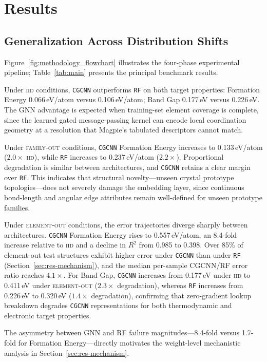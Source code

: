 \documentclass[final,5p,twocolumn,10pt]{elsarticle}
\newcommand{\mae}{\text{MAE}}
\newcommand{\iid}{\textsc{iid}}
\newcommand{\famout}{\textsc{family-out}}
\newcommand{\elout}{\textsc{element-out}}
\newcommand{\cgcnn}{\texttt{CGCNN}}
\newcommand{\rf}{\texttt{RF}}
\begin{document}
\section{Results}
\label{sec:results}

\subsection{Generalization Across Distribution Shifts}
\label{sec:res-shift}

Figure~\ref{fig:methodology_flowchart} illustrates the four-phase experimental
pipeline; Table~\ref{tab:main} presents the principal benchmark results.

Under \iid{} conditions, \cgcnn{} outperforms \rf{} on both target properties:
Formation Energy \mae{} 0.066\,eV/atom versus 0.106\,eV/atom; Band Gap
\mae{} 0.177\,eV versus 0.226\,eV. The GNN advantage is expected when
training-set element coverage is complete, since the learned gated
message-passing kernel can encode local coordination geometry at a
resolution that Magpie's tabulated descriptors cannot match.

Under \famout{} conditions, \cgcnn{} Formation Energy \mae{} increases to
0.133\,eV/atom ($2.0\times$ \iid{}), while \rf{} increases to 0.237\,eV/atom
($2.2\times$). Proportional degradation is similar between architectures,
and \cgcnn{} retains a clear margin over \rf{}. This indicates that
structural novelty---unseen crystal prototype topologies---does not severely
damage the embedding layer, since continuous bond-length and angular edge
attributes remain well-defined for unseen prototype families.

Under \elout{} conditions, the error trajectories diverge sharply between
architectures. \cgcnn{} Formation Energy \mae{} rises to 0.557\,eV/atom,
an 8.4-fold increase relative to \iid{} and a decline in $R^2$ from 0.985
to 0.398. Over 85\% of element-out test structures exhibit higher error
under \cgcnn{} than under \rf{} (Section~\ref{sec:res-mechanism}), and the
median per-sample CGCNN/RF error ratio reaches $4.1\times$. For Band Gap,
\cgcnn{} \mae{} increases from 0.177\,eV under \iid{} to 0.411\,eV under
\elout{} ($2.3\times$ degradation), whereas \rf{} increases from 0.226\,eV
to 0.320\,eV ($1.4\times$ degradation), confirming that zero-gradient
lookup breakdown degrades \cgcnn{} representations for both thermodynamic
and electronic target properties.

The asymmetry between GNN and RF failure magnitudes---8.4-fold versus
1.7-fold for Formation Energy---directly motivates the weight-level
mechanistic analysis in Section~\ref{sec:res-mechanism}.
\end{document}
